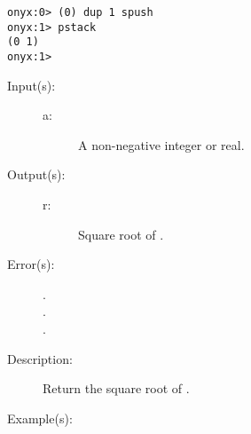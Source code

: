 \begin{description}
\begin{description}
\begin{verbatim}
onyx:0> (0) dup 1 spush
onyx:1> pstack
(0 1)
onyx:1>
		\end{verbatim}
	\end{description}
\label{systemdict:sqrt}
\item[{\onyxop{a}{sqrt}{r}}: ]
	\begin{description}\item[]
	\item[Input(s): ]
		\begin{description}\item[]
		\item[a: ]
			A non-negative integer or real.
		\end{description}
	\item[Output(s): ]
		\begin{description}\item[]
		\item[r: ]
			Square root of .
		\end{description}
	\item[Error(s): ]
		\begin{description}\item[]
		\item[.]
		\item[.]
		\item[.]
		\end{description}
	\item[Description: ]
		Return the square root of .
	\item[Example(s): ]\begin{verbatim}


\end{verbatim}
\end{description}
\end{description}
